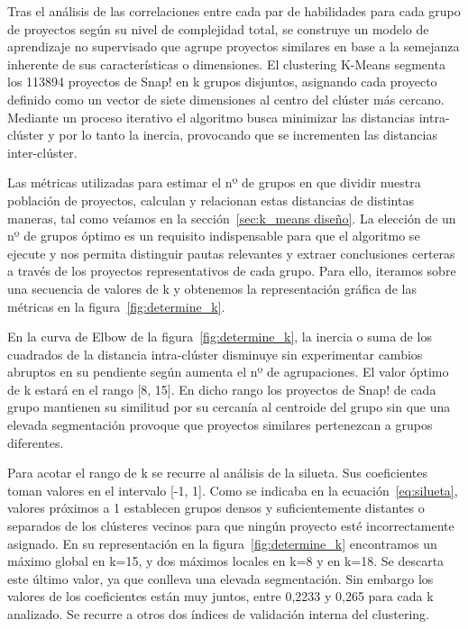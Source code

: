 \documentclass[a4paper, 12pt]{book}
\begin{document}
Tras el análisis de las correlaciones entre cada par de habilidades para cada grupo de proyectos según su nivel de complejidad total, se construye un modelo de aprendizaje no supervisado que agrupe proyectos similares en base a la semejanza inherente de sus características o dimensiones. El clustering K-Means segmenta los 113894 proyectos de Snap! en k grupos disjuntos, asignando cada proyecto definido como un vector de siete dimensiones al centro del clúster más cercano. Mediante un proceso iterativo el algoritmo busca minimizar las distancias intra-clúster y por lo tanto la inercia, provocando que se incrementen las distancias inter-clúster. 

Las métricas utilizadas para estimar el nº de grupos en que dividir nuestra población de proyectos, calculan y relacionan estas distancias de distintas maneras, tal como veíamos en la sección~\ref{sec:k_means diseño}. La elección de un nº de grupos óptimo es un requisito indispensable para que el algoritmo se ejecute y nos permita distinguir pautas relevantes y extraer conclusiones certeras a través de los proyectos representativos de cada grupo. Para ello, iteramos sobre una secuencia de valores de k y obtenemos la representación gráfica de las métricas en la figura~\ref{fig:determine_k}.

En la curva de Elbow de la figura~\ref{fig:determine_k}, la inercia o suma de los cuadrados de la distancia intra-clúster disminuye sin experimentar cambios abruptos en su pendiente según aumenta el nº de agrupaciones. El valor óptimo de k estará en el rango [8, 15]. En dicho rango los proyectos de Snap! de cada grupo mantienen su similitud por su cercanía al centroide del grupo sin que una elevada segmentación provoque que proyectos similares pertenezcan a grupos diferentes. 

Para acotar el rango de k se recurre al análisis de la silueta. Sus coeficientes toman valores en el intervalo [-1, 1]. Como se indicaba en la ecuación~\eqref{eq:silueta}, valores próximos a 1 establecen grupos densos y suficientemente distantes o separados de los clústeres vecinos para que ningún proyecto esté incorrectamente asignado. En su representación en la figura~\ref{fig:determine_k} encontramos un máximo global en k=15, y dos máximos locales en k=8 y en k=18. Se descarta este último valor, ya que conlleva una elevada segmentación. Sin embargo los valores de los coeficientes están muy juntos, entre 0,2233 y 0,265 para cada k analizado. Se recurre a otros dos índices de validación interna del clustering. 
\end{document}
